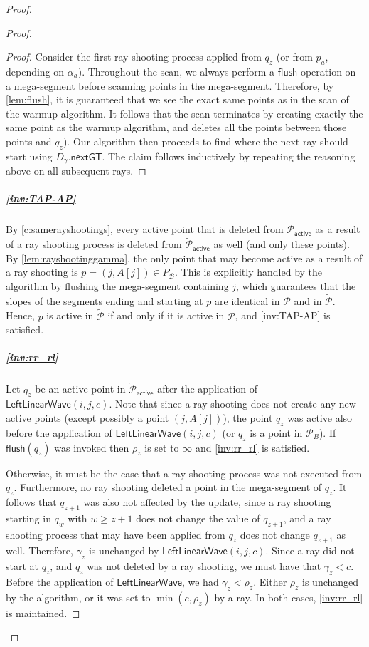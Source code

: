 \documentclass[10pt,a4paper]{article}
\newcommand{\LLW}{\mathsf{LeftLinearWave}}
\newcommand{\local}{\text{short }}
\newcommand{\longrange}{\text{long }}
\newcommand{\nextGT}{\mathsf{nextGT}}
\renewcommand{\P}{\mathcal{P}}
\newcommand{\AP}{\P_{\mathsf{active}}}
\newcommand{\TAP}{\tilde{\P}_{\mathsf{active}}}
\newcommand{\DGAM}{D_{\gamma}}
\newcommand{\TP}{\tilde{\P}}
\newcommand{\para}[1]{\vspace{-0.1in} \subparagraph*{#1}}
\newcommand{\B}{\mathcal{B}}
\newcommand{\rl}[1]{\rho_{#1}}
\newcommand{\flush}{\mathsf{flush}}
\begin{document}
\begin{proof}
\begin{proof}
\begin{proof}
Consider the first \longrange ray shooting process applied from $q_z$ (or from $p_a$, depending on $\alpha_a$).
Throughout the scan, we always perform a $\flush$ operation on a mega-segment before scanning points in the mega-segment.
Therefore, by \cref{lem:flush}, it is guaranteed that we see the exact same points as in the scan of the warmup algorithm.
It follows that the scan terminates by creating exactly the same point as the warmup algorithm, and deletes all the points between those points and $q_z$).
Our algorithm then proceeds to find where the  next  \longrange ray  should start using $\DGAM.\nextGT$.
The claim follows inductively by repeating the reasoning above on all subsequent \longrange rays.
\end{proof}

\para{\cref{inv:TAP-AP}}

By \cref{c:samerayshootings}, every active point that is deleted from $\AP$ as a result of a ray shooting process is deleted from $\TAP$ as well (and only these points).
By \cref{lem:rayshootinggamma}, the only point that may become active as a result of a ray shooting is $p=(j,A[j]) \in P_{\B}$. This is explicitly handled by the algorithm by flushing the mega-segment containing $j$, which guarantees that the slopes of the segments ending and starting at $p$ are identical in $\P$ and in $\TP$. Hence, $p$ is active in $\TP$ if and only if it is active in $\P$, and \cref{inv:TAP-AP} is satisfied.

\para{\cref{inv:rr_rl}}
Let $q_z$ be an active point in $\TAP$ after the application of $\LLW(i,j,c)$.
Note that since a ray shooting does not create any new active points (except possibly a point $(j,A[j])$), the point $q_z$ was  active also before the application of $\LLW(i,j,c)$ (or $q_z$ is a point in $\P_{B}$).
If $\flush(q_z)$ was invoked then $\rl{z}$ is set to $\infty$ and \cref{inv:rr_rl} is satisfied. 

Otherwise, 
    it must be the case that a \longrange ray shooting process was not executed from $q_z$. 
    Furthermore, no \longrange ray shooting deleted a point in the mega-segment of $q_z$.
    It follows that $q_{z+1}$ was also not affected by the update, since a ray shooting starting in $q_w$ with $w \ge z+1$ does not change the value of $q_{z+1}$, and a \local ray shooting process that may have been applied from $q_z$ does not change $q_{z+1}$ as well.
    Therefore, $\gamma_z$ is unchanged by $\LLW(i,j,c)$.
    Since a \longrange ray did not start at $q_z$, and $q_z$ was not deleted by a \longrange ray shooting, we must have that $\gamma_z <c$.
    Before the application of $\LLW$, we had $\gamma_z < \rl{z}$. Either
    $\rl{z}$ is unchanged by the algorithm, or it was set to $\min(c,\rl{z})$ by a \local ray.
    In both cases, \cref{inv:rr_rl} is maintained.


\end{proof}
\end{proof}
\end{document}
